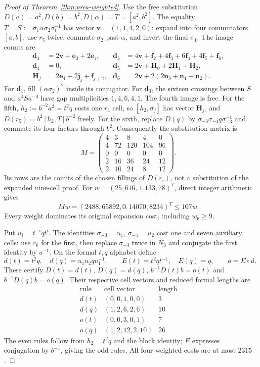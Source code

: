 \documentclass[11pt,a4paper]{article}
\theoremstyle{plain}
\theoremstyle{definition}
\theoremstyle{remark}
\begin{document}
\begin{proof}[Proof of Theorem~\ref{thm:area-weighted}]
Use the free substitution $D(a)=a^2,D(b)=b^2,D(\alpha)=T=[a^2,b^2]$. The equality
$T=S:=\sigma_1\alpha\sigma_2\sigma_1^{-1}$ has vector $\mathbf v=(1,1,4,2,0)$: expand into four commutators $[a,b]$, use $r_5$ twice,
commute $\sigma_2$ past $\alpha$, and invert the final $\sigma_1$. The image counts are
\[
\begin{aligned}
\mathbf d_1&=2\mathbf v+\mathbf e_3+2\mathbf e_1,&
\mathbf d_3&=4\mathbf v+\mathbf f_2+4\mathbf f_3+6\mathbf f_4+4\mathbf f_5+\mathbf f_6,\\
\mathbf d_4&=0,&
\mathbf d_5&=2\mathbf v+\mathbf H_0+2\mathbf H_1+\mathbf H_2,\\
\mathbf H_j&=2\mathbf e_4+2\mathbf j_j+\mathbf f_{j+2},&
\mathbf d_6&=2\mathbf v+2(2\mathbf n_3+\mathbf n_4+\mathbf n_2).
\end{aligned}
\]
For $\mathbf d_1$, fill $(\alpha\sigma_2)^2$ inside its conjugator. For $\mathbf d_3$, the sixteen crossings between $S$ and
$a^4Sa^{-4}$ have gap multiplicities $1,4,6,4,1$. The fourth image is free. For the fifth, $h_2:=b^{-2}a^2=t^2q$ costs one $r_4$ cell,
so $[h_2,\sigma_j]$ has vector $\mathbf H_j$, and $D(r_5)=b^2[h_2,T]b^{-2}$ freely. For the sixth, replace
$D(q)$ by $\sigma_{-3}\sigma_{-4}q\sigma_{-3}^{-1}$ and commute its four factors through $b^2$. Consequently the substitution matrix is
\[
M=\begin{pmatrix}4&3&8&4&0\\4&72&120&104&96\\0&0&0&0&0\\2&16&36&24&12\\2&10&24&8&12\end{pmatrix}.
\]
Its rows are the counts of the chosen fillings of $D(r_i)$, not a substitution of the expanded nine-cell proof.
For $w=(25,616,1,133,78)^T$, direct integer arithmetic gives
\[
Mw=(2488,65892,0,14070,8234)^T\le107w.
\]
Every weight dominates its original expansion cost, including $w_6\ge9$.

Put $u_i=t^{-i}qt^i$. The identities $\sigma_{-3}=u_1$, $\sigma_{-4}=u_2$ cost one and seven auxiliary cells: use $r_6$ for the first,
then replace $\sigma_{-3}$ twice in $N_3$ and conjugate the first identity by $a^{-1}$. On the formal $t,q$ alphabet define
\[
d(t)=t^2q,\quad d(q)=u_1u_2qu_1^{-1},\qquad E(t)=t^2qt^{-1},\quad E(q)=q,\qquad o=E\circ d.
\]
These certify $D(t)=d(t)$, $D(q)=d(q)$, $b^{-1}D(t)b=o(t)$ and $b^{-1}D(q)b=o(q)$. Their respective cell vectors and reduced formal lengths are
\[
\begin{array}{c|c|r}
\text{rule}&\text{cell vector}&\text{length}\\\hline
d(t)&(0,0,1,0,0)&3\\d(q)&(1,2,6,2,6)&10\\o(t)&(0,0,3,0,1)&7\\o(q)&(1,2,12,2,10)&26
\end{array}
\]
The even rules follow from $h_2=t^2q$ and the block identity; $E$ expresses conjugation by $b^{-1}$, giving the odd rules.
All four weighted costs are at most $2315$.


\end{proof}
\end{document}
